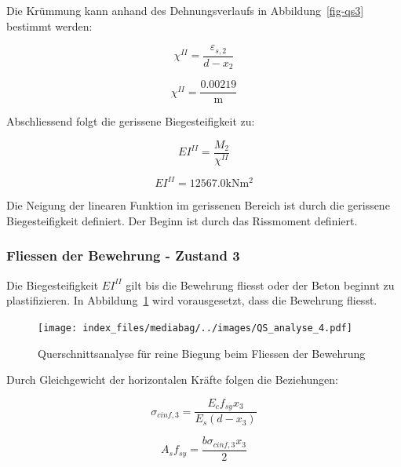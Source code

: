 \documentclass[
  letterpaper,
]{scrreprt}
\begin{document}
Die Krümmung kann anhand des Dehnungsverlaufs in Abbildung~\ref{fig-qs3}
bestimmt werden:

\begin{equation}\chi^{II} = \frac{\varepsilon_{s,2}}{d - x_{2}}\end{equation}

\begin{equation}\chi^{II} = \frac{0.00219}{\text{m}}\end{equation}

Abschliessend folgt die gerissene Biegesteifigkeit zu:

\begin{equation}EI^{II} = \frac{M_{2}}{\chi^{II}}\end{equation}

\begin{equation}EI^{II} = 12567.0 \text{kN} \text{m}^{2}\end{equation}

Die Neigung der linearen Funktion im gerissenen Bereich ist durch die
gerissene Biegesteifigkeit definiert. Der Beginn ist durch das
Rissmoment definiert.

\hypertarget{fliessen-der-bewehrung---zustand-3-1}{%
\subsubsection{Fliessen der Bewehrung - Zustand
3}\label{fliessen-der-bewehrung---zustand-3-1}}

Die Biegesteifigkeit \(EI^{II}\) gilt bis die Bewehrung fliesst oder der
Beton beginnt zu plastifizieren. In Abbildung~\ref{fig-qs4} wird
vorausgesetzt, dass die Bewehrung fliesst.

\begin{figure}[H]

{\centering \texttt{[image: index\_files/mediabag/../images/QS\_analyse\_4.pdf]}

}

\caption{\label{fig-qs4}Querschnittsanalyse für reine Biegung beim
Fliessen der Bewehrung}

\end{figure}

Durch Gleichgewicht der horizontalen Kräfte folgen die Beziehungen:

\begin{equation}\sigma_{c inf,3} = \frac{E_{c} f_{sy} x_{3}}{E_{s} \left(d - x_{3}\right)}\end{equation}

\begin{equation}A_{s} f_{sy} = \frac{b \sigma_{c inf,3} x_{3}}{2}\end{equation}
\end{document}
